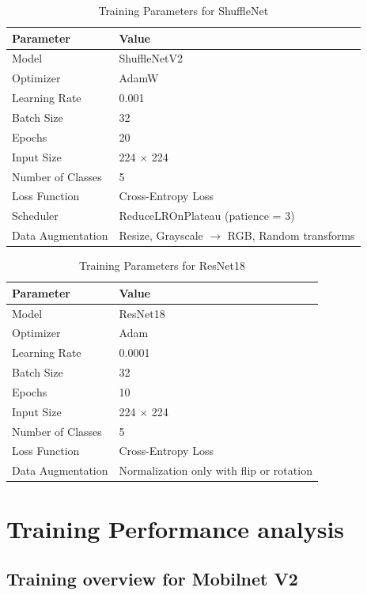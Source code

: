 \begin{table}[H]

\label{tab:shufflenet_params}
\begin{tabular}{ll}
\toprule
\textbf{Parameter} & \textbf{Value} \\
\midrule
Model & ShuffleNetV2 \\
Optimizer & AdamW \\
Learning Rate & 0.001 \\
Batch Size & 32 \\
Epochs & 20 \\
Input Size & 224 $\times$ 224 \\
Number of Classes & 5 \\
Loss Function & Cross-Entropy Loss \\
Scheduler & ReduceLROnPlateau (patience = 3) \\
Data Augmentation & Resize, Grayscale $\rightarrow$ RGB, Random transforms \\
\bottomrule
\end{tabular}
\centering
\caption{Training Parameters for ShuffleNet}
\end{table}


\begin{table}[H]

\label{tab:resnet_params}
\begin{tabular}{ll}
\toprule
\textbf{Parameter} & \textbf{Value} \\
\midrule
Model & ResNet18 \\
Optimizer & Adam \\
Learning Rate & 0.0001 \\
Batch Size & 32 \\
Epochs & 10 \\
Input Size & 224 $\times$ 224 \\
Number of Classes & 5 \\
Loss Function & Cross-Entropy Loss \\
Data Augmentation & Normalization only with flip or rotation\\
\bottomrule
\end{tabular}
\centering
\caption{Training Parameters for ResNet18}
\end{table}

\section{Training Performance analysis}

\subsection{Training overview for Mobilnet V2}


